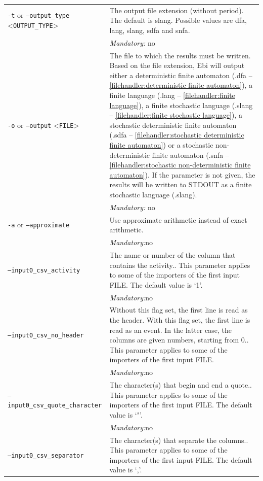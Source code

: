 {\begin{tabularx}{\linewidth}{lX}
\texttt{-t} or \texttt{--output\_type} <\texttt{OUTPUT\_TYPE}> &
The output file extension (without period). The default is slang. Possible values are dfa, lang, slang, sdfa and snfa.\\
&\textit{Mandatory:} \quad no\\
\texttt{-o} or \texttt{--output} <\texttt{FILE}> &
The file to which the results must be written. Based on the file extension, Ebi will output either a deterministic finite automaton (.dfa -- \cref{filehandler:deterministic finite automaton}), a finite language (.lang -- \cref{filehandler:finite language}), a finite stochastic language (.slang -- \cref{filehandler:finite stochastic language}), a stochastic deterministic finite automaton (.sdfa -- \cref{filehandler:stochastic deterministic finite automaton}) or a stochastic non-deterministic finite automaton (.snfa -- \cref{filehandler:stochastic non-deterministic finite automaton}).
If the parameter is not given, the results will be written to STDOUT as a finite stochastic language (.slang).\\
&\textit{Mandatory:} \quad no\\
\texttt{-a} or \texttt{--approximate} & Use approximate arithmetic instead of exact arithmetic.\\
&\textit{Mandatory:}\quad no\\
\texttt{--input0\_csv\_activity} & The name or number of the column that contains the activity.. This parameter applies to some of the importers of the first input FILE. The default value is `1'.\\
&\textit{Mandatory:}\quad no\\
\texttt{--input0\_csv\_no\_header} & Without this flag set, the first line is read as the header. 
    With this flag set, the first line is read as an event. In the latter case, the columns are given numbers, starting from 0.. This parameter applies to some of the importers of the first input FILE. \\
&\textit{Mandatory:}\quad no\\
\texttt{--input0\_csv\_quote\_character} & The character(s) that begin and end a quote.. This parameter applies to some of the importers of the first input FILE. The default value is `"'.\\
&\textit{Mandatory:}\quad no\\
\texttt{--input0\_csv\_separator} & The character(s) that separate the columns.. This parameter applies to some of the importers of the first input FILE. The default value is `,'.\\

\end{tabularx}}
